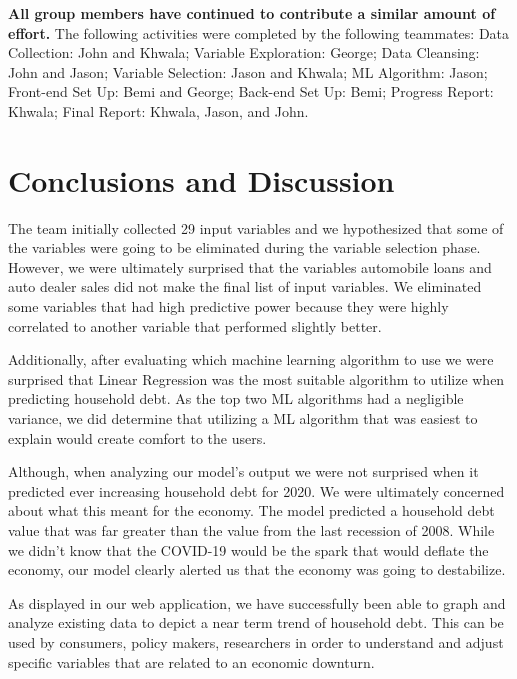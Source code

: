 \documentclass[sigconf,nonacm,11pt]{acmart}
\begin{document}
\textbf{All group members have continued to contribute a similar amount of effort.} The following activities were completed by the following teammates: Data Collection: John and Khwala; Variable Exploration: George; Data Cleansing: John and Jason; Variable Selection: Jason and Khwala; ML Algorithm: Jason; Front-end Set Up: Bemi and George; Back-end Set Up: Bemi; Progress Report: Khwala; Final Report: Khwala, Jason, and John. 



\section{Conclusions and Discussion}


The team initially collected 29 input variables and we hypothesized that some of the variables were going to be eliminated during the variable selection phase. However, we were ultimately surprised that the variables automobile loans and auto dealer sales did not make the final list of input variables. We eliminated some variables that had high predictive power because they were highly correlated to another variable that performed  slightly better.

Additionally, after evaluating which machine learning algorithm to use we were surprised that Linear Regression was the most suitable algorithm to utilize when predicting household debt. As the top two ML algorithms had a negligible variance, we did determine that utilizing a ML algorithm that was easiest to explain would create comfort to the users.

Although, when analyzing our model's output we were not surprised when it predicted ever increasing household debt for 2020. We were ultimately concerned about what this meant for the economy. The model predicted a household debt value that was far greater than the value from the last recession of 2008.  While we didn't know that the COVID-19 would be the spark that would deflate the economy, our model clearly alerted us that the economy was going to destabilize. 

As displayed in our web application, we have successfully been able to graph and analyze existing data to depict a near term trend of household debt. This can be used by consumers, policy makers, researchers in order to understand and adjust specific variables that are related to an economic downturn.


\end{document}
